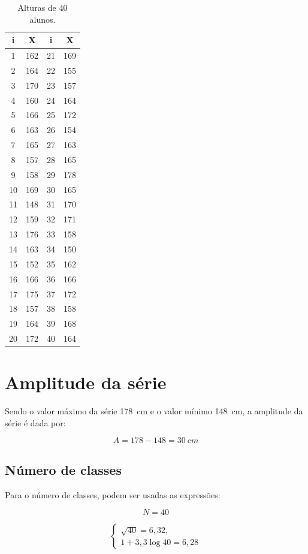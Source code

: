 \documentclass[a4paper,12pt]{article}
\begin{document}
\begin{table}[H]
    \centering
\begin{tabular}{cc|cc}
  \toprule
\textbf{i} & 
\textbf{X} & 
\textbf{i} & 
\textbf{X}\\
\midrule
1 & 162 & 21 & 169 \\
2 & 164 & 22 & 155 \\
3 & 170 & 23 & 157 \\
4 & 160 & 24 & 164 \\
5 & 166 & 25 & 172 \\
6 & 163 & 26 & 154 \\
7 & 165 & 27 & 163 \\
8 & 157 & 28 & 165 \\
9 & 158 & 29 & 178 \\
10 & 169 & 30 & 165 \\
11 & 148 & 31 & 170 \\
12 & 159 & 32 & 171 \\
13 & 176 & 33 & 158 \\
14 & 163 & 34 & 150 \\
15 & 152 & 35 & 162 \\
16 & 166 & 36 & 166 \\
17 & 175 & 37 & 172 \\
18 & 157 & 38 & 158 \\
19 & 164 & 39 & 168 \\
20 & 172 & 40 & 164 \\
\bottomrule
\end{tabular}
\caption{Alturas de 40 alunos.}
\label{tab:alturas}
\end{table}

\section{Amplitude da série}

Sendo o valor máximo da série \SI{178}{cm} e o valor mínimo \SI{148}{cm}, a amplitude da série é dada por:

\[
A = 178 - 148 = \SI{30}{cm}
\]

\subsection{Número de classes}

Para o número de classes, podem ser usadas as expressões:

\[
N = 40
\]

\[
\begin{cases}
\sqrt{40} = 6,32, \\
1 + 3,3\log 40 = 6,28
\end{cases}
\]
\end{document}
